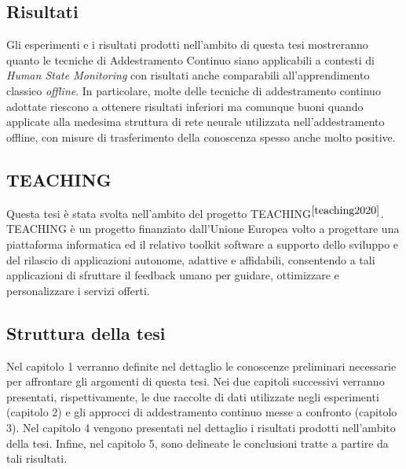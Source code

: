 \subsection*{Risultati}
Gli esperimenti e i risultati prodotti nell'ambito di questa tesi mostreranno quanto le tecniche di Addestramento Continuo siano applicabili a contesti di \textit{Human State Monitoring} con risultati anche comparabili all'apprendimento classico \textit{offline}. In particolare, molte delle tecniche di addestramento continuo adottate riescono a ottenere risultati inferiori ma comunque buoni quando applicate alla medesima struttura di rete neurale utilizzata nell'addestramento offline, con misure di trasferimento della conoscenza spesso anche molto positive.

\subsection*{TEACHING}
Questa tesi è stata svolta nell'ambito del progetto TEACHING$^{\cite{teaching2020}}$.\\TEACHING è un progetto finanziato dall'Unione Europea volto a progettare una piattaforma informatica ed il relativo toolkit software a supporto dello sviluppo e del rilascio di applicazioni autonome, adattive e affidabili, consentendo a tali applicazioni di sfruttare il feedback umano per guidare, ottimizzare e personalizzare i servizi offerti.

\subsection*{Struttura della tesi}
Nel capitolo 1 verranno definite nel dettaglio le conoscenze preliminari necessarie per affrontare gli argomenti di questa tesi. Nei due capitoli successivi verranno presentati, rispettivamente, le due raccolte di dati utilizzate negli esperimenti (capitolo 2) e gli approcci di addestramento continuo messe a confronto (capitolo 3).
Nel capitolo 4 vengono presentati nel dettaglio i risultati prodotti nell'ambito della tesi. Infine, nel capitolo 5, sono delineate le conclusioni tratte a partire da tali risultati.